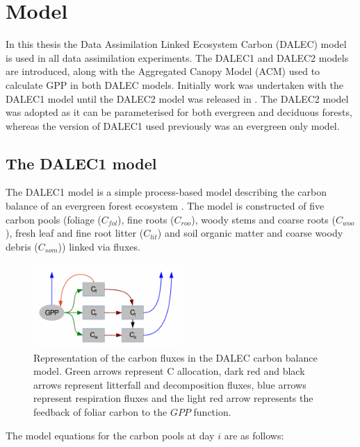 
\section{Model}
In this thesis the Data Assimilation Linked Ecosystem Carbon (DALEC) model is used in all data assimilation experiments. The DALEC1 and DALEC2 models are introduced, along with the Aggregated Canopy Model (ACM) used to calculate GPP in both DALEC models. Initially work was undertaken with the DALEC1 model until the DALEC2 model was released in \citet{Bloom2015}. The DALEC2 model was adopted as it can be parameterised for both evergreen and deciduous forests, whereas the version of DALEC1 used previously was an evergreen only model.

\subsection{The DALEC1 model} \label{chap5:sec:dalec1}

The DALEC1 model is a simple process-based model describing the carbon balance of an evergreen forest ecosystem \cite{williams2005improved}. The model is constructed of five carbon pools (foliage ($C_{fol}$), fine roots ($C_{roo}$), woody stems and coarse roots ($C_{woo}$), fresh leaf and fine root litter ($C_{lit}$) and soil organic matter and coarse woody debris ($C_{som}$)) linked via fluxes.

\begin{figure}[ht]
    \centering
    \includegraphics[width=0.5\textwidth]{chapter/chapter5/DALECpic.png}
    \caption{Representation of the carbon fluxes in the DALEC carbon balance model. Green arrows represent C allocation, dark red and black arrows represent litterfall and decomposition fluxes, blue arrows represent respiration fluxes and the light red arrow represents the feedback of foliar carbon to the $GPP$ function. \citep{delahaies2013regularization}}
    \label{fig:DALEC_mod}
\end{figure}

The model equations for the carbon pools at day $i$ are as follows:

